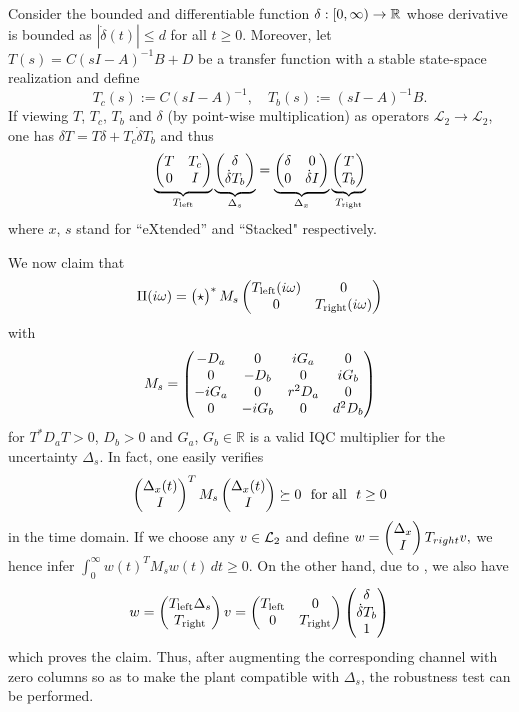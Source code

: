 \begin{lem}\label{lem:swap}
Consider the bounded and differentiable function $\delta:[0,\infty)\to\mathbb{R}$ whose derivative is bounded as $|\dot{\delta}(t)| \leq d$ for all $t\geq 0$. Moreover, let $T(s) = C(sI-A)^{-1}B+D$ be a transfer function with a stable state-space realization and define
\begin{equation*}
T_c(s) :=  C(sI-A)^{-1}, \quad T_b(s) :=  (sI-A)^{-1}B.
\end{equation*}
If viewing $T$, $T_c$, $T_b$ and $\delta$ (by point-wise multiplication) as operators
$\mathcal{L}_2\to \mathcal{L}_2$, one has $\delta T = T\delta  + T_c \dot{\delta} T_b $ and thus
\begin{equation*}
\underbrace{\begin{pmatrix}T &T_c\\0 &I\end{pmatrix}}_{T_{\mathrm{left}}}\underbrace{
\begin{pmatrix}\delta\\ \dot{\delta}T_b\end{pmatrix}}_{\Delta_s} = \underbrace{\begin{pmatrix}\delta &0\\0 & \dot{\delta}I\end{pmatrix}}_{\Delta_x} \underbrace{\begin{pmatrix}T\\T_b\end{pmatrix}}_{T_{\mathrm{right}}}
\end{equation*}
where $x$, $s$ stand for ``eXtended'' and ``Stacked" respectively.
\end{lem}
We now claim that
\[
\Pi(i\omega) = \begin{pmatrix}\star\end{pmatrix}^*{M}_s\begin{pmatrix}T_{\mathrm{left}}(i\omega) &0\\0 &T_{\mathrm{right}}(i\omega)\end{pmatrix}
\]
with
\[
{M}_s = \begin{pmatrix}-D_a &0 &iG_a &0\\0 &-D_b&0&iG_b\\ -iG_a &0 &r^2D_a &0\\0 &-iG_b &0 &d^2D_b\end{pmatrix}
\]
for $T^*D_aT > 0$, $D_b>0$ and $G_a$, $G_b\in\mathbb{R}$ is a valid IQC multiplier for the uncertainty $\Delta_s$. In fact,
one easily verifies
\[
\begin{pmatrix}\Delta_x(t)\\I\end{pmatrix}^TM_s\begin{pmatrix}\Delta_x(t)\\I\end{pmatrix} \succeq 0
\text{\ \ for all\ \ }t\geq 0
\]
in the time domain. If we choose any $v\in \mathcal{L}_2$ and define
$w=\begin{pmatrix}\Delta_x\\I\end{pmatrix}T_{right}v,$
we hence infer $\int_0^\infty w(t)^TM_sw(t)\,dt\geq 0$. On the other hand, due to , we also have
$$
w=\begin{pmatrix}T_{\mathrm{left}}\Delta_s\\T_{\mathrm{right}}\end{pmatrix}v=\begin{pmatrix}T_{\mathrm{left}} &0\\0 &T_{\mathrm{right}}\end{pmatrix}
\begin{pmatrix}\delta \\\dot{\delta}T_b\\1\end{pmatrix}
$$
which proves the claim. Thus, after augmenting the corresponding channel with zero columns so as to make the plant compatible with $\Delta_s$, the robustness test can be performed.


